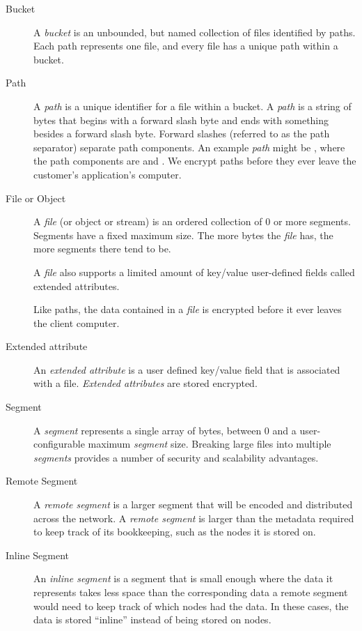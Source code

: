 \documentclass[11pt,fleqn,openany]{book}
\begin{document}
\begin{description}
\item[Bucket] A  {\em bucket} is an unbounded, but named
collection of files identified by paths. Each path represents one
file, and every file has a unique path within a bucket.

\item[Path] A {\em path} is a unique identifier for a file within a
bucket. A {\em path} is a string of bytes that begins with a forward
slash byte and ends with something besides a forward slash byte. Forward
slashes (referred to as the path separator) separate path components.
An example {\em path} might be , where the path components are
 and .
We encrypt paths before they ever leave the customer's application's
computer.

\item[File or Object] A {\em file} (or object or stream) is an ordered
collection of 0 or more segments. Segments have a fixed maximum size.
The more bytes the {\em file} has, the more segments there tend to be.

A {\em file} also supports a limited amount of key/value user-defined fields
called extended attributes.

Like paths, the data contained in a {\em file} is encrypted before it ever
leaves the client computer.

\item[Extended attribute] An {\em extended attribute} is a user defined key/value
field that is associated with a file. {\em Extended attributes} are stored encrypted.

\item[Segment] A {\em segment} represents a single array of bytes, between 0 and a
user-configurable maximum {\em segment} size. Breaking large files into
multiple {\em segments} provides a number of security and scalability advantages.

\item[Remote Segment] A {\em remote segment} is a larger segment that will be
encoded and distributed across the network. A {\em remote segment} is larger than
the metadata required to keep track of its bookkeeping, such as the nodes it
is stored on.

\item[Inline Segment] An {\em inline segment} is a segment that is small
enough where the data it represents takes less space than the corresponding
data a remote segment would need to keep track of which nodes had the data.
In these cases, the data is stored ``inline'' instead of being stored on nodes.


\end{description}
\end{document}
